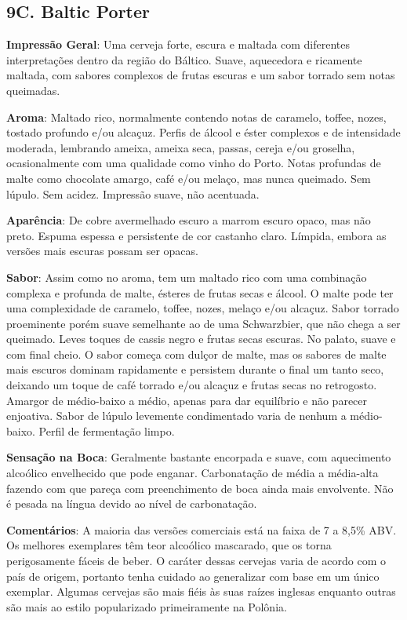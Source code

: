 \subsection*{9C. Baltic Porter}
\textbf{Impressão Geral}: Uma cerveja forte, escura e maltada com diferentes interpretações dentro da região do Báltico. Suave, aquecedora e ricamente maltada, com sabores complexos de frutas escuras e um sabor torrado sem notas queimadas.

\textbf{Aroma}: Maltado rico, normalmente contendo notas de caramelo, toffee, nozes, tostado profundo e/ou alcaçuz. Perfis de álcool e éster complexos e de intensidade moderada, lembrando ameixa, ameixa seca, passas, cereja e/ou groselha, ocasionalmente com uma qualidade como vinho do Porto. Notas profundas de malte como chocolate amargo, café e/ou melaço, mas nunca queimado. Sem lúpulo. Sem acidez. Impressão suave, não acentuada.

\textbf{Aparência}: De cobre avermelhado escuro a marrom escuro opaco, mas não preto. Espuma espessa e persistente de cor castanho claro. Límpida, embora as versões mais escuras possam ser opacas.

\textbf{Sabor}: Assim como no aroma, tem um maltado rico com uma combinação complexa e profunda de malte, ésteres de frutas secas e álcool. O malte pode ter uma complexidade de caramelo, toffee, nozes, melaço e/ou alcaçuz. Sabor torrado proeminente porém suave semelhante ao de uma Schwarzbier, que não chega a ser queimado. Leves toques de cassis negro e frutas secas escuras. No palato, suave e com final cheio. O sabor começa com dulçor de malte, mas os sabores de malte mais escuros dominam rapidamente e persistem durante o final um tanto seco, deixando um toque de café torrado e/ou alcaçuz e frutas secas no retrogosto. Amargor de médio-baixo a médio, apenas para dar equilíbrio e não parecer enjoativa. Sabor de lúpulo levemente condimentado varia de nenhum a médio-baixo. Perfil de fermentação limpo.

\textbf{Sensação na Boca}: Geralmente bastante encorpada e suave, com aquecimento alcoólico envelhecido que pode enganar. Carbonatação de média a média-alta fazendo com que pareça com preenchimento de boca ainda mais envolvente. Não é pesada na língua devido ao nível de carbonatação.

\textbf{Comentários}: A maioria das versões comerciais está na faixa de 7 a 8,5\% ABV. Os melhores exemplares têm teor alcoólico mascarado, que os torna perigosamente fáceis de beber. O caráter dessas cervejas varia de acordo com o país de origem, portanto tenha cuidado ao generalizar com base em um único exemplar. Algumas cervejas são mais fiéis às suas raízes inglesas enquanto outras são mais ao estilo popularizado primeiramente na Polônia.

